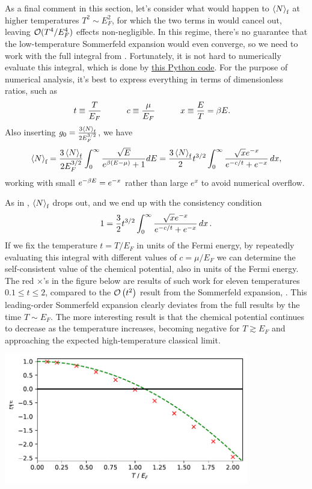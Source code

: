 As a final comment in this section, let's consider what would happen to $\left\langle N \right\rangle_{\text{f}}$ at higher temperatures $T^2 \sim E_F^2$, for which the two terms in  would cancel out, leaving $\mathcal O(T^4 / E_F^4)$ effects non-negligible.
In this regime, there's no guarantee that the low-temperature Sommerfeld expansion would even converge, so we need to work with the full integral from .
Fortunately, it is not hard to numerically evaluate this integral, which is done by \href{https://github.com/daschaich/MATH327_2023/blob/main/lecture_notes/unit08_fermi-gas.py}{this Python code}.
For the purpose of numerical analysis, it's best to express everything in terms of dimensionless ratios, such as
\begin{align*}
  t & \equiv \frac{T}{E_F} \qquad &
  c & \equiv \frac{\mu}{E_F} \qquad &
  x & \equiv \frac{E}{T} = \beta E.
\end{align*}
Also inserting $g_0 = \frac{3\left\langle N \right\rangle_{\text{f}}}{2E_F^{3 / 2}}$, we have
\begin{equation*}
  \left\langle N \right\rangle_{\text{f}} = \frac{3\left\langle N \right\rangle_{\text{f}}}{2E_F^{3 / 2}} \int_0^{\infty} \frac{\sqrt{E}}{e^{\beta(E - \mu)} + 1} dE = \frac{3\left\langle N \right\rangle_{\text{f}}}{2} t^{3 / 2} \int_0^{\infty} \frac{\sqrt{x} e^{-x}}{e^{-c / t} + e^{-x}} \mathop{dx},
\end{equation*}
working with small $e^{-\beta E} = e^{-x}$ rather than large $e^x$ to avoid numerical overflow.

As in , $\left\langle N \right\rangle_{\text{f}}$ drops out, and we end up with the consistency condition
\begin{equation}
  1 = \frac{3}{2} t^{3 / 2} \int_0^{\infty} \frac{\sqrt{x} e^{-x}}{e^{-c / t} + e^{-x}} \mathop{dx}.
\end{equation}
If we fix the temperature $t = T / E_F$ in units of the Fermi energy, by repeatedly evaluating this integral with different values of $c = \mu / E_F$ we can determine the self-consistent value of the chemical potential, also in units of the Fermi energy.
The red $\times$'s in the figure below are results of such work for eleven temperatures $0.1 \leq t \leq 2$, compared to the $\mathcal O\left(t^2\right)$ result from the Sommerfeld expansion, .
This leading-order Sommerfeld expansion clearly deviates from the full results by the time $T \sim E_F$.
The more interesting result is that the chemical potential continues to decrease as the temperature increases, becoming negative for $T \gtrsim E_F$ and approaching the expected high-temperature classical limit.

\begin{center}\noindent\includegraphics[width=0.8\textwidth]{figs/unit08_fermi-gas.pdf}\end{center}
